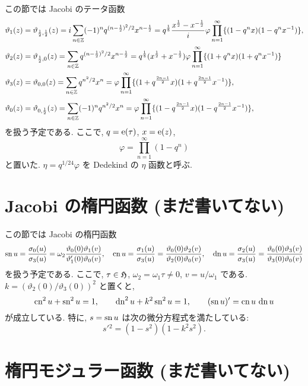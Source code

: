\documentclass[12pt,twoside]{jarticle}
\def\e{{\text{\rm e}}}
\def\sn{\mathop{\text{\rm sn}}\nolimits}
\def\cn{\mathop{\text{\rm cn}}\nolimits}
\def\dn{\mathop{\text{\rm dn}}\nolimits}
\def\vt{\vartheta}
\def\H{{\frak H}}
\def\Z{{\Bbb Z}} %
\begin{document}
この節では Jacobi のテータ函数
\begin{align*}
  & \vt_1(z)=\vt_{\frac12,\frac12}(z)
  = i \sum_{n\in\Z} (-1)^n q^{(n-\frac12)^2/2} x^{n-\frac12}
  =
  q^{\frac18} \frac{x^{\frac12}-x^{-\frac12}}{i}
  \varphi
  \prod_{n=1}^\infty
  \{(1 - q^n x) (1 - q^n x^{-1})\},
  \\
  & \vt_2(z)=\vt_{\frac12,0}(z)
  = \sum_{n\in\Z} q^{(n-\frac12)^2/2} x^{n-\frac12}
  =
  q^{\frac18} (x^{\frac12}+x^{-\frac12})
  \varphi
  \prod_{n=1}^\infty
  \{(1 + q^n x) (1 + q^n x^{-1})\}
  \\
    & \vt_3(z)=\vt_{0,0}(z)
  = \sum_{n\in\Z} q^{n^2/2} x^n
  =
  \varphi
  \prod_{n=1}^\infty
  \{(1 + q^{\frac{2n-1}{2}} x) (1 + q^{\frac{2n-1}{2}} x^{-1})\},
  \\
  & \vt_0(z)=\vt_{0,\frac12}(z)
  = \sum_{n\in\Z} (-1)^n q^{n^2/2} x^n
  =
  \varphi
  \prod_{n=1}^\infty
  \{(1 - q^{\frac{2n-1}{2}} x) (1 - q^{\frac{2n-1}{2}} x^{-1})\},
\end{align*}
を扱う予定である. ここで, $q=\e(\tau)$, $x=\e(z)$,
\[
  \varphi = \prod_{n=1}^\infty (1 - q^n)
\]
と置いた. $\eta=q^{1/24}\varphi$ を Dedekind の $\eta$ 函数と呼ぶ.


\section{Jacobi の楕円函数 (まだ書いてない)}


この節では Jacobi の楕円函数
\[
  \sn u = \frac{\sigma_0(u)}{\sigma_3(u)}
  = \omega_2 \frac{\vt_0(0)\vt_1(v)}{\vt_1'(0)\vt_0(v)},
  \quad
  \cn u = \frac{\sigma_1(u)}{\sigma_3(u)}
  = \frac{\vt_0(0)\vt_2(v)}{\vt_2(0)\vt_0(v)},
  \quad
  \dn u = \frac{\sigma_2(u)}{\sigma_3(u)}
  = \frac{\vt_0(0)\vt_3(v)}{\vt_3(0)\vt_0(v)}
\]
を扱う予定である. ここで, $\tau\in\H$, $\omega_2=\omega_1\tau\ne0$, %
$v=u/\omega_1$ である. $k=(\vt_2(0)/\vt_3(0))^2$ と置くと, 
\[
  \cn^2 u + \sn^2 u = 1,
  \qquad
  \dn^2 u + k^2 \sn^2 u = 1,
  \qquad
  (\sn u)' = \cn u\, \dn u
\]
が成立している. 特に, $s=\sn u$ は次の微分方程式を満たしている:
\[
  s'{}^2 = (1 - s^2)(1- k^2 s^2).
\]


\section{楕円モジュラー函数 (まだ書いてない)}
\end{document}
